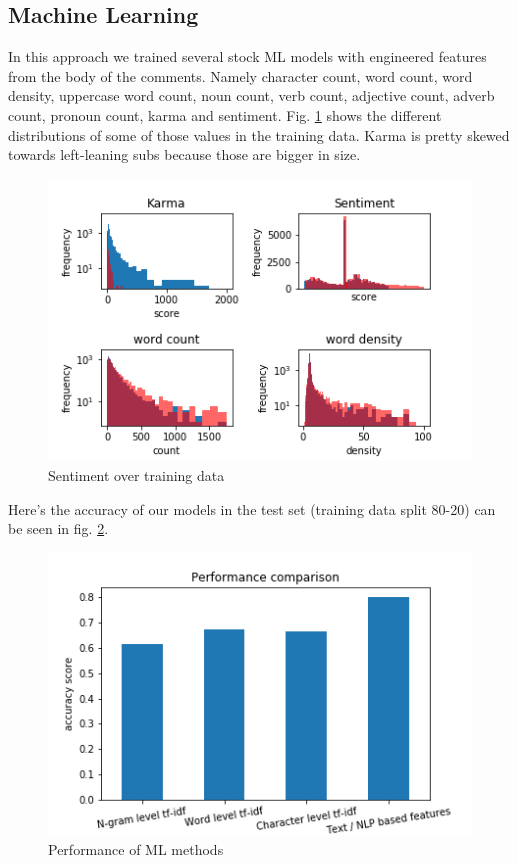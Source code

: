 \documentclass[11pt]{article}
\begin{document}
\subsection{Machine Learning}

In this approach we trained several stock ML models with engineered features from the body of the comments. Namely character count, word count, word density, uppercase word count, noun count, verb count, adjective count, adverb count, pronoun count, karma and sentiment. Fig. \ref{features} shows the different distributions of some of those values in the training data. Karma is pretty skewed towards left-leaning subs because those are bigger in size.

\begin{figure}[h]
	\includegraphics[width=\columnwidth]{img/training_stats.png}
	\caption{\label{features}Sentiment over training data}
\end{figure}

Here's the accuracy of our models in the test set (training data split 80-20) can be seen in fig. \ref{performance}.

\begin{figure}[h]
	\includegraphics[width=\columnwidth]{img/performance.png}
	\caption{\label{performance} Performance of ML methods}
\end{figure}
\end{document}
